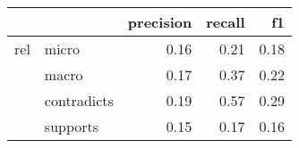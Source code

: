 \begin{tabular}{llrrr}
\toprule
    &          &  precision &  recall &   f1 \\
\midrule
rel & micro &       0.16 &    0.21 & 0.18 \\
    & macro &       0.17 &    0.37 & 0.22 \\
    & contradicts &       0.19 &    0.57 & 0.29 \\
    & supports &       0.15 &    0.17 & 0.16 \\
\bottomrule
\end{tabular}
